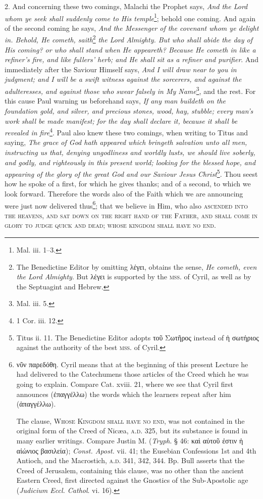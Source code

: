 2. And concerning these two comings, Malachi the Prophet says, \emph{And the Lord whom ye seek shall suddenly come to His temple}\footnote{Mal. iii. 1–3.}; behold one coming. And again of the second coming he says, \emph{And the Messenger of the covenant whom ye delight in. Behold, He cometh, saith}\footnote{The Benedictine Editor by omitting \textgreek{λέγει}, obtains the sense, \emph{He cometh, even the Lord Almighty}. But \textgreek{λέγει} is supported by the \textsc{mss.} of Cyril, as well as by the Septuagint and Hebrew.} \emph{the Lord Almighty. But who shall abide the day of His coming? or who shall stand when He appeareth? Because He cometh in like a refiner’s fire, and like fullers’ herb; and He shall sit as a refiner and purifier}. And immediately after the Saviour Himself says, \emph{And I will draw near to you in judgment; and I will be a swift witness against the sorcerers, and against the adulteresses, and against those who swear falsely in My Name}\footnote{Mal. iii. 5.}, and the rest. For this cause Paul warning us beforehand says, \emph{If any man buildeth on the foundation gold, and silver, and precious stones, wood, hay, stubble; every man’s work shall be made manifest; for the day shall declare it, because it shall be revealed in fire}\footnote{1 Cor. iii. 12.}. Paul also knew these two comings, when writing to Titus and saying, \emph{The grace of God hath appeared which bringeth salvation unto all men, instructing us that, denying ungodliness and worldly lusts, we should live soberly, and godly, and righteously in this present world; looking for the blessed hope, and appearing of the glory of the great God and our Saviour Jesus Christ}\footnote{Titus ii. 11. The Benedictine Editor adopts \textgreek{τοῦ Σωτῆρος} instead of \textgreek{ἡ σωτήριος} against the authority of the best \textsc{mss.} of Cyril.}. Thou seest how he spoke of a first, for which he gives thanks; and of a second, to which we look forward. Therefore the words also of the Faith which we are announcing were just now delivered thus\footnote{\textgreek{νῦν παρεδόθη}. Cyril means that at the beginning of this present Lecture he had delivered to the Catechumens those articles of the Creed which he was going to explain. Compare Cat. xviii. 21, where we see that Cyril first announces (\textgreek{ἐπαγγέλλω}) the words which the learners repeat after him (\textgreek{ἀπαγγέλλω}). \par The clause, \textsc{Whose Kingdom shall have no end}, was not contained in the original form of the Creed of Nicæa, \textsc{a.d.} 325, but its substance is found in many earlier writings. Compare Justin M. (\emph{Tryph}. § 46: \textgreek{καὶ αὐτοῦ ἐστιν ἡ αἰώνιος βασιλεία}); \emph{Const. Apost.} vii. 41; the Eusebian Confessions 1st and 4th Antioch, and the Macrostich, \textsc{a.d.} 341, 342, 344. Bp. Bull asserts that the Creed of Jerusalem, containing this clause, was no other than the ancient Eastern Creed, first directed against the Gnostics of the Sub-Apostolic age (\emph{Judicium Eccl. Cathol}. vi. 16).}; that we believe in Him, who also \textsc{ascended into the heavens, and sat} \textsc{down on the right hand of the Father, and shall come in glory to judge quick and dead; whose kingdom shall have no end}.

